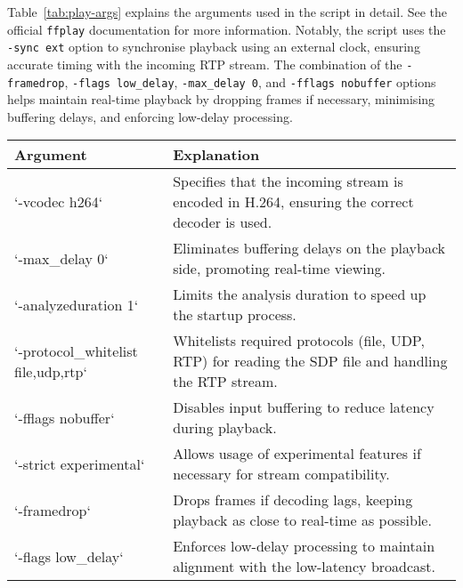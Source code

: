 Table~\ref{tab:play-args} explains the arguments used in the script in detail.
See the official \texttt{ffplay} documentation for more
information\cite{ffplayDocumentation}. Notably, the script uses the
\texttt{-sync ext} option to synchronise playback using an external clock,
ensuring accurate timing with the incoming RTP stream. The combination of the
\texttt{-framedrop}, \texttt{-flags low\_delay}, \texttt{-max\_delay 0}, and
\texttt{-fflags nobuffer} options \linebreak helps maintain real-time playback by dropping
frames if necessary, minimising buffering delays, and enforcing low-delay
processing.

\begin{table}[!ht]
	\centering
	\begin{tabular}{|p{5cm}|p{10cm}|}
		\hline
		Argument                            & Explanation                                                                                                             \\ \hline
		`-vcodec h264`                      & Specifies that the incoming stream is encoded in H.264, ensuring the correct decoder is used.                           \\ \hline
		`-max\_delay 0`                     & Eliminates buffering delays on the playback side, promoting real-time viewing.                                          \\ \hline
		`-analyzeduration 1`                & Limits the analysis duration to speed up the startup process.                                                           \\ \hline
		`-protocol\_whitelist file,udp,rtp` & Whitelists required protocols (file, UDP, RTP) for reading the SDP file and handling the RTP stream.                    \\ \hline
		`-fflags nobuffer`                  & Disables input buffering to reduce latency during playback.                                                             \\ \hline
		`-strict experimental`              & Allows usage of experimental features if necessary for stream compatibility.                                            \\ \hline
		`-framedrop`                        & Drops frames if decoding lags, keeping playback as close to real-time as possible.                                      \\ \hline
		`-flags low\_delay`                 & Enforces low-delay processing to maintain alignment with the low-latency broadcast.                                     \\ \hline

\end{tabular}
\end{table}
